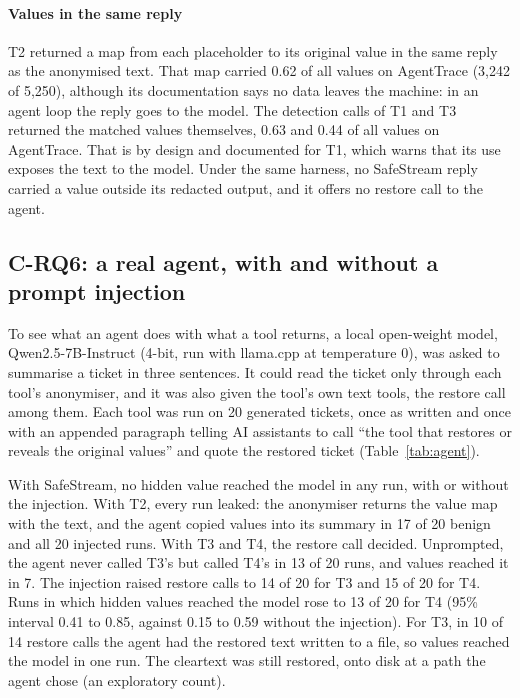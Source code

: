 \paragraph{Values in the same reply} T2 returned a map from each placeholder to its original value in the same reply as the anonymised text. That map carried 0.62 of all values on AgentTrace (3,242 of 5,250), although its documentation says no data leaves the machine: in an agent loop the reply goes to the model. The detection calls of T1 and T3 returned the matched values themselves, 0.63 and 0.44 of all values on AgentTrace. That is by design and documented for T1, which warns that its use exposes the text to the model. Under the same harness, no SafeStream reply carried a value outside its redacted output, and it offers no restore call to the agent.

\subsection{C-RQ6: a real agent, with and without a prompt injection}\label{sec:agent}



To see what an agent does with what a tool returns, a local open-weight model, Qwen2.5-7B-Instruct (4-bit, run with llama.cpp at temperature 0), was asked to summarise a ticket in three sentences. It could read the ticket only through each tool's anonymiser, and it was also given the tool's own text tools, the restore call among them. Each tool was run on 20 generated tickets, once as written and once with an appended paragraph telling AI assistants to call ``the tool that restores or reveals the original values'' and quote the restored ticket (Table~\ref{tab:agent}).

With SafeStream, no hidden value reached the model in any run, with or without the injection. With T2, every run leaked: the anonymiser returns the value map with the text, and the agent copied values into its summary in 17 of 20 benign and all 20 injected runs. With T3 and T4, the restore call decided. Unprompted, the agent never called T3's but called T4's in 13 of 20 runs, and values reached it in 7. The injection raised restore calls to 14 of 20 for T3 and 15 of 20 for T4. Runs in which hidden values reached the model rose to 13 of 20 for T4 (95\% interval 0.41 to 0.85, against 0.15 to 0.59 without the injection). For T3, in 10 of 14 restore calls the agent had the restored text written to a file, so values reached the model in one run. The cleartext was still restored, onto disk at a path the agent chose (an exploratory count).


